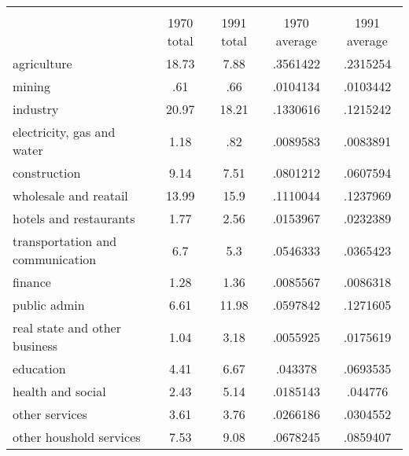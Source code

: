 \begin{tabular}{l*{4}{c}}
\hline\hline
            &\multicolumn{4}{c}{}                               \\
            &  1970 total&  1991 total&1970 average&1991 average\\
\hline
agriculture &       18.73&        7.88&    .3561422&    .2315254\\
mining      &         .61&         .66&    .0104134&    .0103442\\
industry    &       20.97&       18.21&    .1330616&    .1215242\\
electricity, gas and water&        1.18&         .82&    .0089583&    .0083891\\
construction&        9.14&        7.51&    .0801212&    .0607594\\
wholesale and reatail&       13.99&        15.9&    .1110044&    .1237969\\
hotels and restaurants&        1.77&        2.56&    .0153967&    .0232389\\
transportation and communication&         6.7&         5.3&    .0546333&    .0365423\\
finance     &        1.28&        1.36&    .0085567&    .0086318\\
public admin&        6.61&       11.98&    .0597842&    .1271605\\
real state and other business&        1.04&        3.18&    .0055925&    .0175619\\
education   &        4.41&        6.67&     .043378&    .0693535\\
health and social&        2.43&        5.14&    .0185143&     .044776\\
other services&        3.61&        3.76&    .0266186&    .0304552\\
other houshold services&        7.53&        9.08&    .0678245&    .0859407\\
\hline\hline
\end{tabular}
